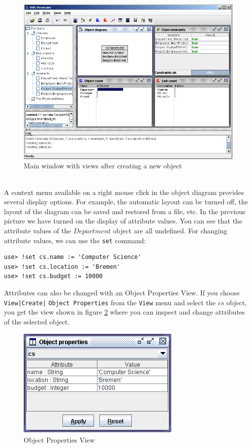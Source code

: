\documentclass[a4paper,titlepage,oneside,final]{scrreprt} %
\begin{document}
\begin{figure}[ht]
\centering
\includegraphics[scale=0.5]{Screenshots/GUI/ViewsWithObject.png}
\caption{Main window with views after creating a new object}
\label{fig:ViewsWithObject}
\end{figure}\\
A context menu available on a right mouse click in the object
diagram provides several display options. For example, the automatic
layout can be turned off, the layout of the diagram can be saved and
restored from a file, etc. In the previous picture we have turned on
the display of attribute values. You can see that the attribute values
of the $\mathit{Department}$ object are all undefined.
For changing attribute values, we can use the \verb+set+ command:
\begin{verbatim}
use> !set cs.name := 'Computer Science'
use> !set cs.location := 'Bremen'
use> !set cs.budget := 10000
\end{verbatim}
Attributes can also be changed with an Object Properties View.
If you choose \verb+View|Create|+ \verb+Object Properties+ from the \verb+View+ menu
and select the $\mathit{cs}$ object, you get the view shown
in figure \ref{fig:ObjectProperties}
where you can inspect and change attributes of the selected object.\\
\begin{figure}[ht]
\centering
\includegraphics[scale=0.7]{Screenshots/GUI/ObjectProperties.png}
\caption{Object Properties View}
\label{fig:ObjectProperties}
\end{figure}\\
\end{document}
